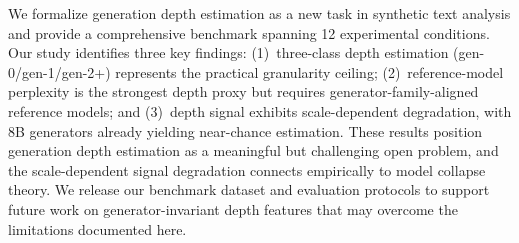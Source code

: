 \documentclass[11pt]{article}
\begin{document}
We formalize generation depth estimation as a new task in synthetic text analysis and provide a comprehensive benchmark spanning 12 experimental conditions.
Our study identifies three key findings: (1)~three-class depth estimation (gen-0/gen-1/gen-2+) represents the practical granularity ceiling; (2)~reference-model perplexity is the strongest depth proxy but requires generator-family-aligned reference models; and (3)~depth signal exhibits scale-dependent degradation, with 8B generators already yielding near-chance estimation.
These results position generation depth estimation as a meaningful but challenging open problem, and the scale-dependent signal degradation connects empirically to model collapse theory.
We release our benchmark dataset and evaluation protocols to support future work on generator-invariant depth features that may overcome the limitations documented here.



\end{document}
